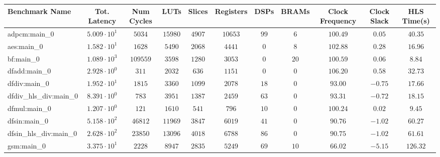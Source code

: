 \begin{tabular}{|l|c|c|c|c|c|c|c|c|c|c|}
\hline
Benchmark Name          & Tot. Latency           & Num Cycles & LUTs      & Slices    & Registers & DSPs    & BRAMs   & Clock Frequency & Clock Slack & HLS Time(s) \\
\hline
adpcm:main\_0           & $ 5.009 \cdot 10^{1} $ & $ 5034   $ & $ 15980 $ & $ 4907  $ & $ 10653 $ & $ 99  $ & $ 6   $ & $ 100.49      $ & $ 0.05    $ & $ 40.35   $ \\
aes:main\_0             & $ 1.582 \cdot 10^{1} $ & $ 1628   $ & $ 5490  $ & $ 2068  $ & $ 4441  $ & $ 0   $ & $ 8   $ & $ 102.88      $ & $ 0.28    $ & $ 16.96   $ \\
bf:main\_0              & $ 1.089 \cdot 10^{3} $ & $ 109559 $ & $ 3598  $ & $ 1280  $ & $ 3053  $ & $ 0   $ & $ 20  $ & $ 100.59      $ & $ 0.06    $ & $ 8.84    $ \\
dfadd:main\_0           & $ 2.928 \cdot 10^{0} $ & $ 311    $ & $ 2032  $ & $ 636   $ & $ 1151  $ & $ 0   $ & $ 0   $ & $ 106.20      $ & $ 0.58    $ & $ 32.73   $ \\
dfdiv:main\_0           & $ 1.952 \cdot 10^{1} $ & $ 1815   $ & $ 3360  $ & $ 1099  $ & $ 2078  $ & $ 18  $ & $ 0   $ & $ 93.00       $ & $ -0.75   $ & $ 17.66   $ \\
dfdiv\_hls\_div:main\_0 & $ 8.391 \cdot 10^{0} $ & $ 783    $ & $ 3951  $ & $ 1387  $ & $ 2459  $ & $ 63  $ & $ 0   $ & $ 93.31       $ & $ -0.72   $ & $ 18.15   $ \\
dfmul:main\_0           & $ 1.207 \cdot 10^{0} $ & $ 121    $ & $ 1610  $ & $ 541   $ & $ 796   $ & $ 10  $ & $ 0   $ & $ 100.24      $ & $ 0.02    $ & $ 9.45    $ \\
dfsin:main\_0           & $ 5.158 \cdot 10^{2} $ & $ 46812  $ & $ 11969 $ & $ 3847  $ & $ 6019  $ & $ 41  $ & $ 0   $ & $ 90.76       $ & $ -1.02   $ & $ 60.27   $ \\
dfsin\_hls\_div:main\_0 & $ 2.628 \cdot 10^{2} $ & $ 23850  $ & $ 13096 $ & $ 4018  $ & $ 6788  $ & $ 86  $ & $ 0   $ & $ 90.75       $ & $ -1.02   $ & $ 61.61   $ \\
gsm:main\_0             & $ 3.375 \cdot 10^{1} $ & $ 2228   $ & $ 8947  $ & $ 2835  $ & $ 5249  $ & $ 69  $ & $ 10  $ & $ 66.02       $ & $ -5.15   $ & $ 126.32  $ \\

\end{tabular}
